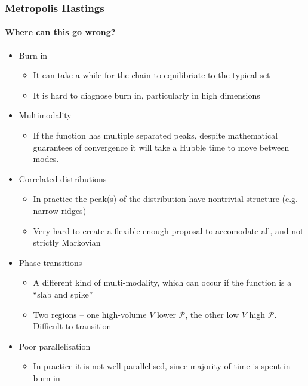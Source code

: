 \documentclass[aspectratio=169]{beamer}
\begin{document}
\begin{frame}
    \frametitle{Metropolis Hastings} 
    \framesubtitle{Where can this go wrong?}
    \begin{itemize}
        \item Burn in
            \begin{itemize}
                \item It can take a while for the chain to equilibriate to the typical set
                \item It is hard to diagnose burn in, particularly in high dimensions
            \end{itemize}
        \item Multimodality
            \begin{itemize}
                \item If the function has multiple separated peaks, despite mathematical guarantees of convergence it will take a Hubble time to move between modes.
            \end{itemize}
        \item Correlated distributions
            \begin{itemize}
                \item In practice the peak(s) of the distribution have nontrivial structure (e.g. narrow ridges)
                \item Very hard to create a flexible enough proposal to accomodate all, and not strictly Markovian
            \end{itemize}
        \item Phase transitions
            \begin{itemize}
                \item A different kind of multi-modality, which can occur if the function is a ``slab and spike''
                \item Two regions -- one high-volume $V$ lower $\mathcal{P}$, the other low $V$ high $\mathcal{P}$. Difficult to transition
            \end{itemize}
        \item Poor parallelisation
            \begin{itemize}
                \item In practice it is not well parallelised, since majority of time is spent in burn-in
            \end{itemize}
    \end{itemize}
\end{frame}
\end{document}
